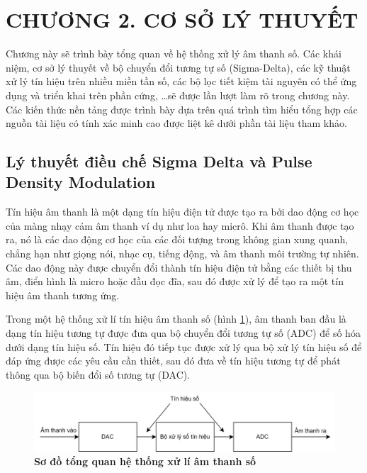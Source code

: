 \section*{CHƯƠNG 2. CƠ SỞ LÝ THUYẾT} \label{chuong2}
\setcounter{section}{2}
\setcounter{figure}{0}
\setcounter{table}{0}
Chương này sẽ trình bày tổng quan về hệ thống xử lý âm thanh số. Các khái niệm, cơ sở lý thuyết về bộ chuyển đổi tương tự số (Sigma-Delta), các kỹ thuật xử lý tín hiệu trên nhiều miền tần số, các bộ lọc tiết kiệm tài nguyên có thể ứng dụng và triển khai trên phần cứng, \ldots sẽ được lần lượt làm rõ trong chương này. Các kiến thức nền tảng được trình bày dựa trên quá trình tìm hiểu tổng hợp các nguồn tài liệu có tính xác minh cao được liệt kê dưới phần tài liệu tham khảo.

\subsection{ Lý thuyết điều chế Sigma Delta và Pulse Density Modulation}
Tín hiệu âm thanh là một dạng tín hiệu điện tử được tạo ra bởi dao động cơ học của màng nhạy cảm âm thanh ví dụ như loa hay micrô. Khi âm thanh được tạo ra, nó là các dao động cơ học của các đối tượng trong không gian xung quanh, chẳng hạn như giọng nói, nhạc cụ, tiếng động, và âm thanh môi trường tự nhiên. Các dao động này được chuyển đổi thành tín hiệu điện tử bằng các thiết bị thu âm, điển hình là micro hoặc đầu đọc đĩa, sau đó được xử lý để tạo ra một tín hiệu âm thanh tương ứng.

Trong một hệ thống xử lí tín hiệu âm thanh số (hình \ref{hinh21}), âm thanh ban đầu là dạng tín hiệu tương tự  được đưa qua bộ chuyển đổi tương tự số (ADC) để số hóa dưới dạng tín hiệu số. Tín hiệu đó tiếp tục được xử lý qua bộ xử lý tín hiệu số để đáp ứng được các yêu cầu cần thiết, sau đó đưa về tín hiệu tương tự để phát thông qua bộ biến đổi số tương tự (DAC). 

\begin{figure}[!ht]
    \centering
    
    \includegraphics[width=15cm]{Images/top.png}
    \caption[Sơ đồ khối của hệ thống]{\bfseries \fontsize{12pt}{0pt}\selectfont Sơ đồ tổng quan hệ thống xử lí âm thanh số}
    \label{hinh21}
\end{figure}

